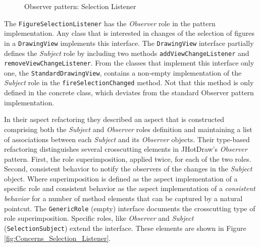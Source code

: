 \begin{figure}[H]
	\centering
  	\caption{Observer pattern: Selection Listener \cite{marin2005approach}}
  	\label{fig:Selection_Listener}
\end{figure}

The \texttt{FigureSelectionListener} has the \textit{Observer} role in the pattern implementation. 
Any class that is interested in changes of the selection of figures in a \texttt{DrawingView} implements this interface. 
The \texttt{DrawingView} interface partially defines the \textit{Subject} role by including two methods \texttt{addViewChangeListener} and \texttt{removeViewChangeListener}.
From the classes that implement this interface only one, the \texttt{StandardDrawingView}, contains a non-empty implementation of the \textit{Subject} role in the \texttt{fireSelectionChanged} method.
Not that this method is only defined in the concrete class, which deviates from the standard Observer pattern implementation.

In their aspect refactoring they described an aspect that is constructed comprising both the \textit{Subject} and \textit{Observer} roles definition and maintaining a list of associations between each \textit{Subject} and its \textit{Observer} objects.
Their type-based refactoring\cite{marin2005approach} distinguishes several crosscutting elements in JHotDraw's \textit{Observer} pattern. 
First, the role superimposition, applied twice, for each of the two roles. 
Second, consistent behavior to notify the observers of the changes in the \textit{Subject} object.
Where superimposition is defined as the aspect implementation of a specific role and consistent behavior as the aspect implementation of a \textit{consistent behavior} for a number of method elements that can be captured by a natural pointcut.
The \texttt{GenericRole} (empty) interface documents the crosscutting type of role superimposition. 
Specific roles, like \textit{Observer} and \textit{Subject} (\texttt{SelectionSubject}) extend the interface.
These elements are shown in Figure \ref{fig:Concerns_Selection_Listener}.

